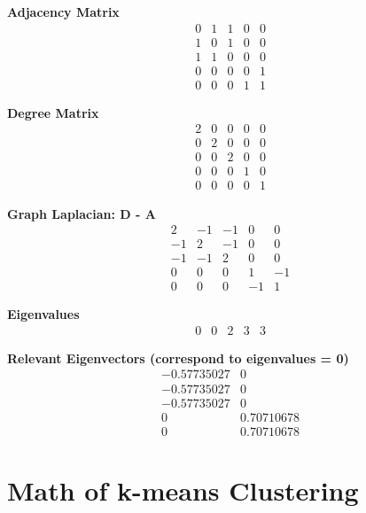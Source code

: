 \documentclass[twoside,10pt]{article}
\begin{document}
\begin{enumerate}
\textbf{Adjacency Matrix}
\[
\begin{matrix}
0 & 1 & 1 & 0 & 0 \\
1 & 0 & 1 & 0 & 0 \\
1 & 1 & 0 & 0 & 0 \\
0 & 0 & 0 & 0 & 1 \\
0 & 0 & 0 & 1 & 1
\end{matrix}
\]

\textbf{Degree Matrix}
\[
\begin{matrix}
2 & 0 & 0 & 0 & 0 \\
0 & 2 & 0 & 0 & 0 \\
0 & 0 & 2 & 0 & 0 \\
0 & 0 & 0 & 1 & 0 \\
0 & 0 & 0 & 0 & 1
\end{matrix}
\]

\textbf{Graph Laplacian: D - A}
\[
\begin{matrix}
2 & -1 & -1 & 0 & 0 \\
-1 & 2 & -1 & 0 & 0 \\
-1 & -1 & 2 & 0 & 0 \\
0 & 0 & 0 & 1 & -1 \\
0 & 0 & 0 & -1 & 1
\end{matrix}
\]

\textbf{Eigenvalues}
\[
\begin{matrix}
0 & 0 & 2 & 3 & 3
\end{matrix}
\]

\textbf{Relevant Eigenvectors (correspond to eigenvalues = 0)}
\[
\begin{matrix}
-0.57735027 & 0  \\
-0.57735027 & 0  \\
-0.57735027 & 0  \\
0 & 0.70710678  \\
0 & 0.70710678
\end{matrix}
\]
\end{enumerate}

\section{Math of k-means Clustering}
\end{document}
